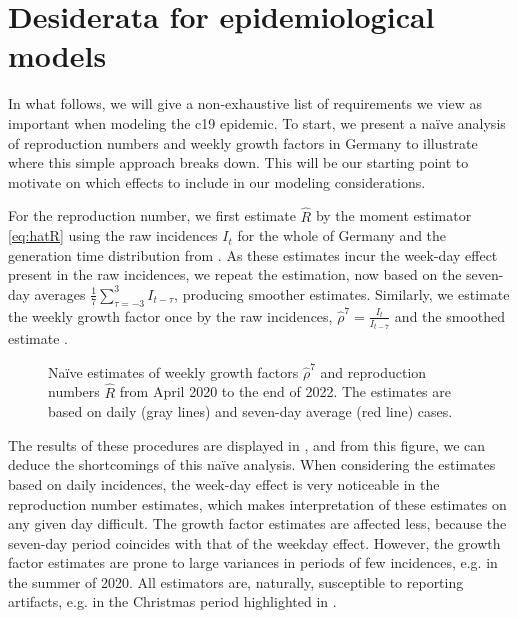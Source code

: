 \section{Desiderata for epidemiological models}
\label{sec:dessiderata}


In what follows, we will give a non-exhaustive list of requirements we view as important when modeling the \acrshort{c19} epidemic. To start, we present a na\"{i}ve analysis of reproduction numbers and weekly growth factors in Germany to illustrate where this simple approach breaks down. This will be our starting point to motivate on which effects to include in our modeling considerations.

For the reproduction number, we first estimate $\hat R$ by the moment estimator \eqref{eq:hatR} using the raw incidences $I_{t}$ for the whole of Germany and the generation time distribution from . As these estimates incur the week-day effect present in the raw incidences, we repeat the estimation, now based on the seven-day averages $\frac{1}{7}\sum_{\tau = -3}^3I_{t - \tau}$, producing smoother estimates. 
Similarly, we estimate the weekly growth factor once by the raw incidences, $ \hat \rho^{7} = \frac{I_{t}}{I_{t - 7}}$ and the smoothed estimate .

\begin{figure}
    \resizebox{\textwidth}{!}{%
    }
    \caption{Na\"{i}ve estimates of weekly growth factors $\hat \rho^{7}$ and reproduction numbers $\hat R$ from April 2020 to the end of 2022. The estimates are based on daily (gray lines) and seven-day average (red line) cases.}
    \label{fig:rho_and_R_naive}
\end{figure}

The results of these procedures are displayed in , and from this figure, we can deduce the shortcomings of this na\"{i}ve analysis. When considering the estimates based on daily incidences, the week-day effect is very noticeable in the reproduction number estimates, which makes interpretation of these estimates on any given day difficult. The growth factor estimates are affected less, because the seven-day period coincides with that of the weekday effect. However, the growth factor estimates are prone to large variances in periods of few incidences, e.g. in the summer of 2020. All estimators are, naturally, susceptible to reporting artifacts, e.g. in the Christmas period highlighted in .

